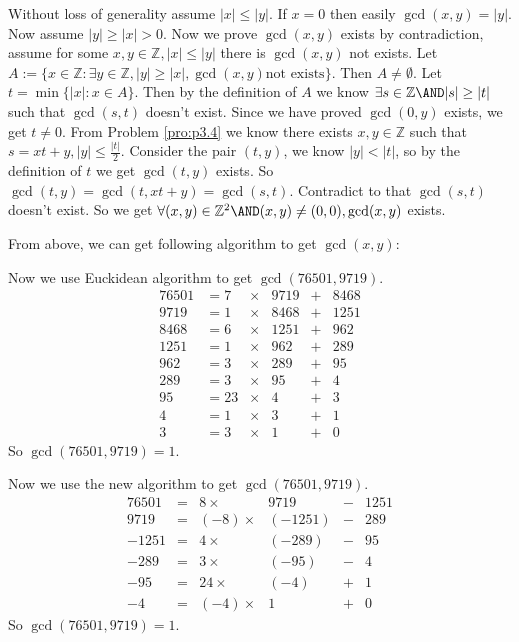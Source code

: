 \documentclass{ctexart}
\begin{document}
\begin{solution}
	Without loss of generality assume \(|x| \leq |y|\). If \(x=0\) then easily \(\gcd(x,y)=|y|\).
	Now assume \(|y| \geq |x| >0\). Now we prove \(\gcd(x,y)\) exists by contradiction, assume for some \(x,y \in \mathbb{Z},|x|\leq|y|\) there is \(\gcd(x,y)\) not exists.
	Let \(A:=\{x \in \mathbb{Z}:\exists y \in \mathbb{Z},|y| \geq |x|,\gcd(x,y) \text{not exists}\}\).
	Then \(A \neq \emptyset\). Let \(t = \min\{|x|:x \in A\}\). Then by the definition of \(A\) we know \(\exists s \in \mathbb{Z} \AND |s| \geq |t|\) such that \(\gcd(s,t)\) doesn't exist.
	Since we have proved \(\gcd(0,y)\) exists, we get \(t \neq 0\).
	From Problem \ref{pro:p3.4} we know there exists \(x,y \in \mathbb{Z}\) such that \(s=xt+y,|y| \leq \frac{|t|}{2}\).
	Consider the pair \((t,y)\), we know \(|y|< |t|\), so by the definition of \(t\) we get \(\gcd(t,y)\) exists.
	So \(\gcd(t,y)=\gcd(t,xt+y)=\gcd(s,t)\). Contradict to that \(\gcd(s,t)\) doesn't exist.
	So we get \(\forall(x,y) \in \mathbb{Z}^2 \AND (x,y)\neq (0,0),\gcd(x,y)\) exists.

	From above, we can get following algorithm to get \(\gcd(x,y)\):
	

	Now we use Euckidean algorithm to get \(\gcd(76501,9719)\).
	\[
		\begin{aligned}
			76501 & = 7  & \times & 9719 & + & 8468 \\
			9719  & = 1  & \times & 8468 & + & 1251 \\
			8468  & = 6  & \times & 1251 & + & 962  \\
			1251  & = 1  & \times & 962  & + & 289  \\
			962   & = 3  & \times & 289  & + & 95   \\
			289   & =3   & \times & 95   & + & 4    \\
			95    & = 23 & \times & 4    & + & 3    \\
			4     & = 1  & \times & 3    & + & 1    \\
			3     & = 3  & \times & 1    & + & 0
		\end{aligned}
	\]
	So \(\gcd(76501,9719)=1\).

	Now we use the new algorithm to get \(\gcd(76501,9719)\).
	\[
		\begin{aligned}
			76501 & = & 8   \times   & 9719    & - & 1251 \\
			9719  & = & (-8)  \times & (-1251) & - & 289  \\
			-1251 & = & 4   \times   & (-289)  & - & 95   \\
			-289  & = & 3   \times   & (-95)   & - & 4    \\
			-95   & = & 24  \times   & (-4)    & + & 1    \\
			-4    & = & (-4)  \times & 1       & + & 0
		\end{aligned}
	\]
	So \(\gcd(76501,9719)=1\).
\end{solution}
\end{document}
